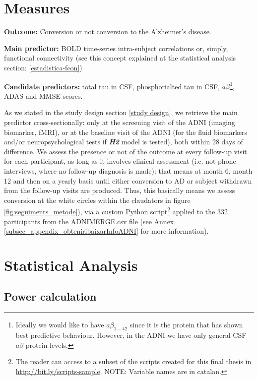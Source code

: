 \documentclass[a4paper,12pt]{elsarticle}  %
\begin{document}
\section{Measures} \label{measures}

	\textbf{Outcome:} Conversion or not conversion to the Alzheimer's disease.
	
	\textbf{Main predictor:} BOLD time-series intra-subject correlations or, simply, functional connectivity (see this concept explained at the statistical analysis section: \ref{estadistica-fcon}) 
	
	\textbf{Candidate predictors:} total tau in CSF, phosphorialted tau in CSF, 	$a\beta$\footnote{Ideally we would like to have $a\beta_{1-42}$ since it is the protein that has shown best predictive behaviour. However, in the ADNI we have only general CSF $a\beta$ protein levels.}, ADAS and MMSE scores.
	
	As we stated in the study design section \ref{study design}, we retrieve the main predictor cross-sectionally: only at the screening visit of the ADNI (imaging biomarker, fMRI), or at the baseline visit of the ADNI (for the fluid biomarkers and/or neuropsychological tests if \textit{\textbf{H2}} model  is tested), both within 28 days of difference. We assess the presence or not of the outcome at every follow-up visit for each participant, as long as it involves clinical assessment (i.e. not phone interviews, where no follow-up diagnosis is made): that means at month 6, month 12 and then on a yearly basis until either conversion to AD or subject withdrawn from the follow-up visits are produced. Thus, this basically means we assess conversion at the white circles within the claudators in figure \ref{fig:seguiments_metode}), via a custom Python script\footnote{The reader can access to a subset of the scripts created for this final thesis in \href{http://bit.ly/scripts-sample}{http://bit.ly/scripts-sample}. NOTE: Variable names are in catalan.} applied to the 332 participants from the ADNIMERGE.csv file (see Annex \ref{subsec_appendix_obteniribaixarInfoADNI} for more information).



\section{Statistical Analysis} 


\subsection{Power calculation} \label{PowerCalculation}
\end{document}
